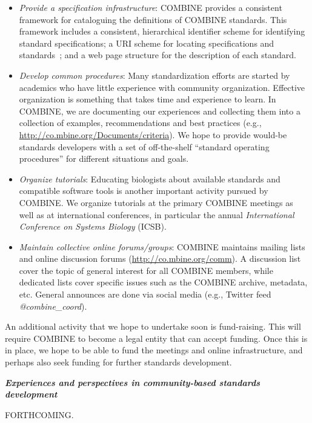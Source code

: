\begin{itemize}
\item \emph{Provide a specification infrastructure}: COMBINE provides a consistent framework for cataloguing the definitions of COMBINE standards. This framework includes a consistent, hierarchical identifier scheme for identifying standard specifications; a URI scheme for locating specifications and standards~\cite[using Identifiers.org to provide permanent, resolvable URIs for standards;][]{Juty2012}; and a web page structure for the description of each standard.

\item \emph{Develop common procedures}: Many standardization efforts are started by academics who have little experience with community organization.  Effective organization is something that takes time and experience to learn.  In COMBINE, we are documenting our experiences and collecting them into a collection of examples, recommendations and best practices (e.g., \url{http://co.mbine.org/Documents/criteria}).  We hope to provide would-be standards developers with a set of off-the-shelf ``standard operating procedures'' for different situations and goals.

\item \emph{Organize tutorials}: Educating biologists about available standards and compatible software tools is another important activity pursued by COMBINE.  We organize tutorials at the primary COMBINE meetings as well as at international conferences, in particular the annual \emph{International Conference on Systems Biology} (ICSB).

\item \emph{Maintain collective online forums/groups}:  COMBINE maintains mailing lists and online discussion forums (\url{http://co.mbine.org/comm}).  A discussion list cover the topic of general interest for all COMBINE members, while dedicated lists cover specific issues such as the COMBINE archive, metadata, etc.  General announces are done via social media (e.g., Twitter feed \emph{@combine\_coord}).

\end{itemize}


An additional activity that we hope to undertake soon is fund-raising.  This will require COMBINE to become a legal entity that can accept funding.  Once this is in place, we hope to be able to fund the meetings and online infrastructure, and perhaps also seek funding for further standards development.


\clearpage
\textbf{\textsl{Experiences and perspectives in community-based standards development}}

FORTHCOMING.


